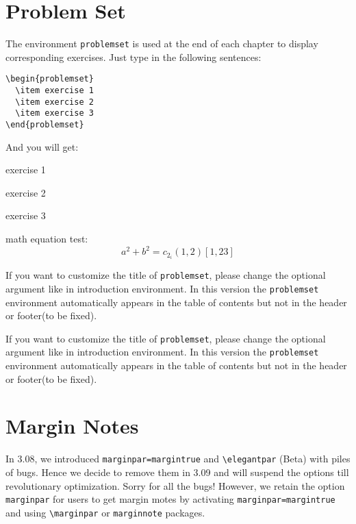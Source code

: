 \documentclass[11pt,fancy,twocol]{elegantbook}
\begin{document}
\section{Problem Set}
The environment \lstinline{problemset} is used at the end of each chapter to display corresponding exercises. Just type in the following sentences:
\begin{lstlisting}
\begin{problemset}
  \item exercise 1
  \item exercise 2
  \item exercise 3
\end{problemset}
\end{lstlisting}
And you will get:
\begin{problemset}
  \item exercise 1
  \item exercise 2
  \item exercise 3
  \item math equation test:
  \begin{equation}
  a^2+b^2=c_{2_{i}} (1,2) [1,23]
  \end{equation}
\end{problemset}
\begin{remark}
If you want to customize the title of \lstinline{problemset}, please change the optional argument like in introduction environment. In this version the \lstinline{problemset} environment automatically appears in the table of contents but not in the header or footer(to be fixed).
\end{remark}

\begin{solution}
  If you want to customize the title of \lstinline{problemset}, please change the optional argument like in introduction environment. In this version the \lstinline{problemset} environment automatically appears in the table of contents but not in the header or footer(to be fixed).
\end{solution}

\section{Margin Notes}
In 3.08, we introduced \lstinline{marginpar=margintrue} and \lstinline{\elegantpar} (Beta) with piles of bugs. Hence we decide to remove them in 3.09 and will suspend the options till revolutionary optimization. Sorry for all the bugs! However, we retain the option \lstinline{marginpar} for users to get margin motes by activating \lstinline{marginpar=margintrue} and using \lstinline{\marginpar} or \lstinline{marginnote} packages.
\end{document}
